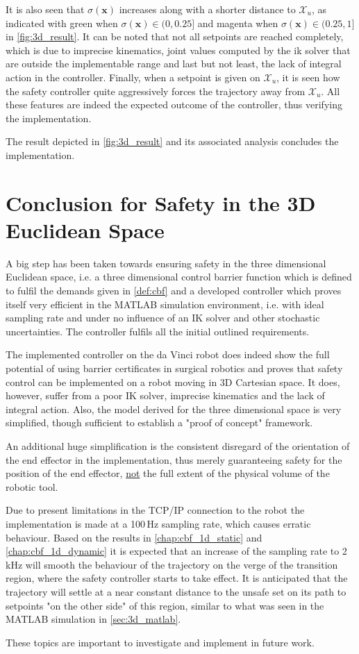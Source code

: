 It is also seen that $\sigma(\textbf{x})$ increases along with a shorter distance to $\mathcal{X}_u$, as indicated with green when $\sigma (\textbf{x}) \in (0,0.25]$ and magenta  when $\sigma (\textbf{x}) \in (0.25,1]$ in \autoref{fig:3d_result}. It can be noted that not all setpoints are reached completely, which is due to imprecise kinematics, joint values computed by the \gls{ik} solver that are outside the implementable range and last but not least, the lack of integral action in the controller. Finally, when a setpoint is given on $\mathcal{X}_u$, it is seen how the safety controller quite aggressively forces the trajectory away from $\mathcal{X}_u$. All these features are indeed the expected outcome of the controller, thus verifying the implementation. 

The result depicted in \autoref{fig:3d_result} and its associated analysis concludes the implementation.

\section{Conclusion for Safety in the 3D Euclidean Space}	
A big step has been taken towards ensuring safety in the three dimensional Euclidean space, i.e. a three dimensional control barrier function which is defined to fulfil the demands given in \autoref{def:cbf} and a developed controller which proves itself very efficient in the MATLAB simulation environment, i.e. with ideal sampling rate and under no influence of an IK solver and other stochastic uncertainties. The controller fulfils all the initial outlined requirements.

The implemented controller on the da Vinci robot does indeed show the full potential of using barrier certificates in surgical robotics and proves that safety control can be implemented on a robot moving in 3D Cartesian space. It does, however, suffer from a poor IK solver, imprecise kinematics and the lack of integral action. Also, the model derived for the three dimensional space is very simplified, though sufficient to establish a "proof of concept" framework. 

An additional huge simplification is the consistent disregard of the orientation of the end effector in the implementation, thus merely guaranteeing safety for the position of the end effector, \underline{not} the full extent of the physical volume of the robotic tool. 

Due to present limitations in the TCP/IP connection to the robot the implementation is made at a 100\,Hz sampling rate, which causes erratic behaviour. Based on the results in \autoref{chap:cbf_1d_static} and \autoref{chap:cbf_1d_dynamic} it is expected that an increase of the sampling rate to  2\,kHz will smooth the behaviour of the trajectory on the verge of the transition region, where the safety controller starts to take effect. It is anticipated that the trajectory will settle at a near constant distance to the unsafe set on its path to setpoints "on the other side" of this region, similar to what was seen in the MATLAB simulation in \autoref{sec:3d_matlab}.

These topics are important to investigate and implement in future work.

